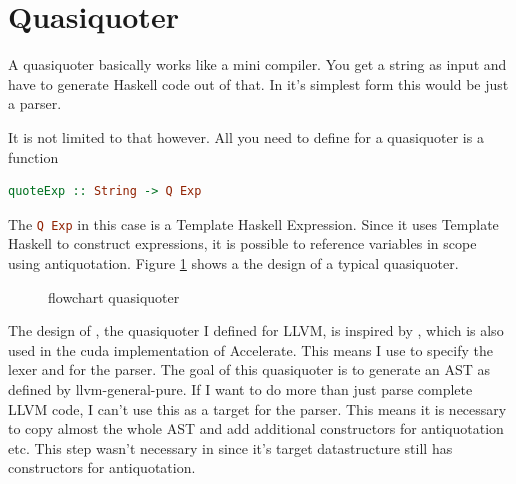 \documentclass[a4paper,bibliography=totocnumbered,parskip,headsepline]{scrbook}
\begin{document}
\section{Quasiquoter}
A quasiquoter basically works like a mini compiler.
You get a string as input and have to generate Haskell code out of that.
In it's simplest form this would be just a parser.

It is not limited to that however.
All you need to define for a quasiquoter is a function
\begin{lstlisting}[language=haskell]
quoteExp :: String -> Q Exp
\end{lstlisting}
The \lstinline[language=haskell]!Q Exp! in this case is a Template Haskell Expression.
Since it uses Template Haskell to construct expressions, it is possible to reference variables in scope using antiquotation.
Figure \ref{fig:quasichart} shows a the design of a typical quasiquoter.

\begin{figure}
\begin{center}
\end{center}
\caption{flowchart quasiquoter}
\label{fig:quasichart}
\end{figure}

The design of , the quasiquoter I defined for LLVM, is inspired by , which is also used in the cuda implementation of Accelerate.
This means I use  to specify the lexer and  for the parser.
The goal of this quasiquoter is to generate an AST as defined by llvm-general-pure.
If I want to do more than just parse complete LLVM code, I can't use this as a target for the parser.
This means it is necessary to copy almost the whole AST and add additional constructors for antiquotation etc.
This step wasn't necessary in  since it's target datastructure still has constructors for antiquotation.
\end{document}
